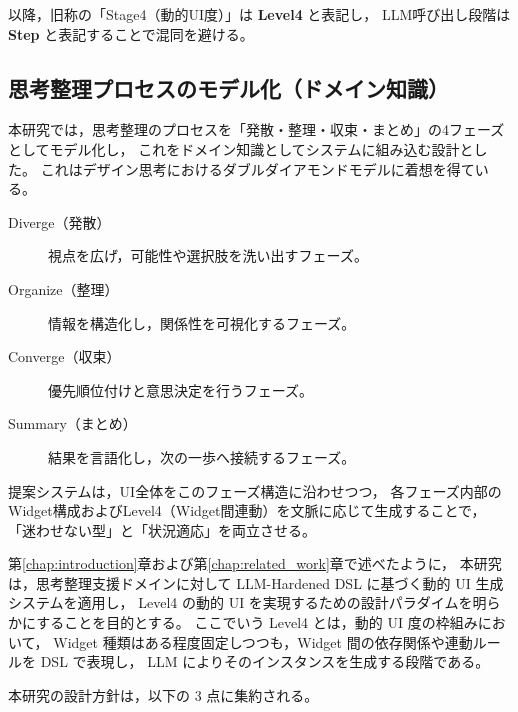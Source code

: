\documentclass[senior,final,11pt,dvipdfmx]{iputit-thesis}
\begin{document}
以降，旧称の「Stage4（動的UI度）」は \textbf{Level4} と表記し，
LLM呼び出し段階は \textbf{Step} と表記することで混同を避ける。




\subsection{思考整理プロセスのモデル化（ドメイン知識）}
本研究では，思考整理のプロセスを「発散・整理・収束・まとめ」の4フェーズとしてモデル化し，
これをドメイン知識としてシステムに組み込む設計とした。
これはデザイン思考におけるダブルダイアモンドモデル\cite{design_council2005}に着想を得ている。

\begin{description}
  \item[Diverge（発散）] 視点を広げ，可能性や選択肢を洗い出すフェーズ。
  \item[Organize（整理）] 情報を構造化し，関係性を可視化するフェーズ。
  \item[Converge（収束）] 優先順位付けと意思決定を行うフェーズ。
  \item[Summary（まとめ）] 結果を言語化し，次の一歩へ接続するフェーズ。
\end{description}

提案システムは，UI全体をこのフェーズ構造に沿わせつつ，
各フェーズ内部のWidget構成およびLevel4（Widget間連動）を文脈に応じて生成することで，
「迷わせない型」と「状況適応」を両立させる。


第\ref{chap:introduction}章および第\ref{chap:related_work}章で述べたように，
本研究は，思考整理支援ドメインに対して LLM-Hardened DSL に基づく動的 UI 生成システムを適用し，
Level4 の動的 UI を実現するための設計パラダイムを明らかにすることを目的とする。
ここでいう Level4 とは，動的 UI 度の枠組みにおいて，
Widget 種類はある程度固定しつつも，Widget 間の依存関係や連動ルールを DSL で表現し，
LLM によりそのインスタンスを生成する段階である。

本研究の設計方針は，以下の 3 点に集約される。
\end{document}
